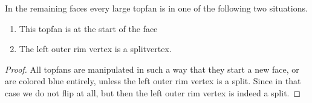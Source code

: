 \begin{lemma}
  \label{lm:topfan:remainingTopfans}
  In the remaining faces every large topfan is in one of the following two situations.
  \begin{enumerate}
    \item  This topfan is at the start of the face
    \item  The left outer rim vertex is a splitvertex.
  \end{enumerate}
\end{lemma}
\begin{proof}
  All topfans are manipulated in such a way that they start a new face, or are colored blue entirely, unless the left outer rim vertex is a split. Since in that case we do not flip at all, but then the left outer rim vertex is indeed a split.
\end{proof}
